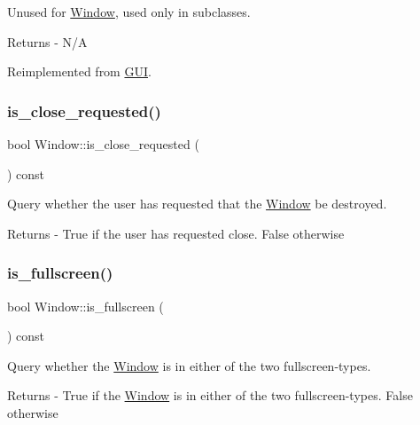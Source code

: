 Unused for \mbox{\hyperlink{class_window}{Window}}, used only in subclasses. \begin{DoxyReturn}{Returns}
-\/ N/A 
\end{DoxyReturn}


Reimplemented from \mbox{\hyperlink{class_g_u_i_a34753a0119188e4b17b4b5209c795c3a}{G\+UI}}.

\mbox{\label{class_window_a95d3193d85c5f8ffed21eeef995602f7}} 
\subsubsection{\texorpdfstring{is\+\_\+close\+\_\+requested()}{is\_close\_requested()}}
{\footnotesize\ttfamily bool Window\+::is\+\_\+close\+\_\+requested (\begin{DoxyParamCaption}{ }\end{DoxyParamCaption}) const}

Query whether the user has requested that the \mbox{\hyperlink{class_window}{Window}} be destroyed. \begin{DoxyReturn}{Returns}
-\/ True if the user has requested close. False otherwise 
\end{DoxyReturn}
\mbox{\label{class_window_a2b9672924d8048d74098deeb4202dc76}} 
\subsubsection{\texorpdfstring{is\+\_\+fullscreen()}{is\_fullscreen()}}
{\footnotesize\ttfamily bool Window\+::is\+\_\+fullscreen (\begin{DoxyParamCaption}{ }\end{DoxyParamCaption}) const}

Query whether the \mbox{\hyperlink{class_window}{Window}} is in either of the two fullscreen-\/types. \begin{DoxyReturn}{Returns}
-\/ True if the \mbox{\hyperlink{class_window}{Window}} is in either of the two fullscreen-\/types. False otherwise 
\end{DoxyReturn}
\mbox{\label{class_window_a43a34a3321d0a9bd30dbba747af14c6a}} 
